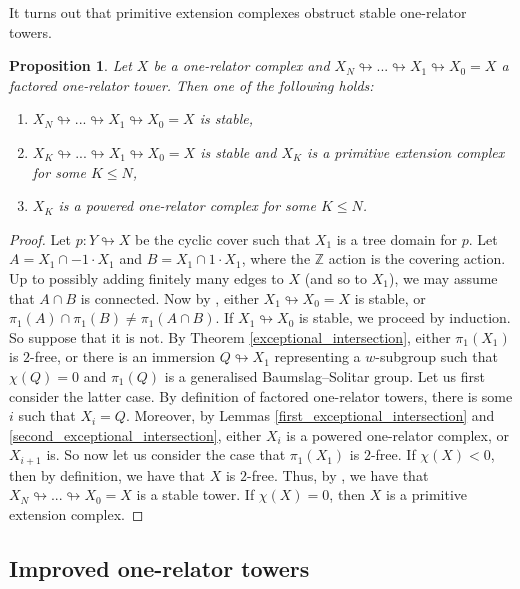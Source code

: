 \documentclass[11pt, a4paper]{amsart}
\newtheorem{proposition}[theorem]{Proposition}
\theoremstyle{definition}
\newcommand{\Z}{\mathbb{Z}}
\def\immerses{\looparrowright}
\begin{document}
It turns out that primitive extension complexes obstruct stable one-relator towers.

\begin{proposition}
\label{pe_hierarchy}
Let $X$ be a one-relator complex and $X_N\immerses ...\immerses X_1\immerses X_0 = X$ a factored one-relator tower. Then one of the following holds:
\begin{enumerate}
\item $X_N\immerses ...\immerses X_1\immerses X_0 = X$ is stable,
\item $X_K\immerses ...\immerses X_1\immerses X_0 = X$ is stable and $X_K$ is a primitive extension complex for some $K\leq N$,
\item $X_K$ is a powered one-relator complex for some $K\leq N$.
\end{enumerate}
\end{proposition}

\begin{proof}
Let $p:Y\immerses X$ be the cyclic cover such that $X_1$ is a tree domain for $p$. Let $A = X_1\cap -1\cdot X_1$ and $B = X_1\cap 1\cdot X_1$, where the $\Z$ action is the covering action. Up to possibly adding finitely many edges to $X$ (and so to $X_1$), we may assume that $A\cap B$ is connected. Now by \cite[Lemma 7.8]{me_22}, either $X_1\immerses X_0 = X$ is stable, or $\pi_1(A)\cap \pi_1(B)\neq \pi_1(A\cap B)$. If $X_1\immerses X_0$ is stable, we proceed by induction. So suppose that it is not. By Theorem \ref{exceptional_intersection}, either $\pi_1(X_1)$ is $2$-free, or there is an immersion $Q\immerses X_1$ representing a $w$-subgroup such that $\chi(Q) = 0$ and $\pi_1(Q)$ is a generalised Baumslag--Solitar group. Let us first consider the latter case. By definition of factored one-relator towers, there is some $i$ such that $X_i = Q$. Moreover, by Lemmas \ref{first_exceptional_intersection} and \ref{second_exceptional_intersection}, either $X_i$ is a powered one-relator complex, or $X_{i+1}$ is. So now let us consider the case that $\pi_1(X_1)$ is $2$-free. If $\chi(X)<0$, then by definition, we have that $X$ is $2$-free. Thus, by \cite[Theorems 7.8 \& 7.9]{me_22}, we have that $X_N\immerses ...\immerses X_0 = X$ is a stable tower. If $\chi(X) = 0$, then $X$ is a primitive extension complex.
\end{proof}


\subsection{Improved one-relator towers}
\end{document}
